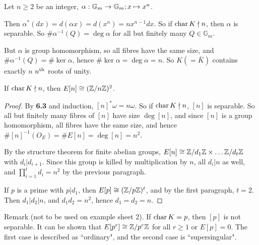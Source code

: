 \documentclass[10pt,a4paper]{article}
\begin{document}
Let $n \geq 2$ be an integer, $\alpha:\mathbb{G}_m \to \mathbb{G}_m; x\mapsto x^n$.

Then $\alpha^{\ast}(dx) = d(\alpha x) =d(x^n) = nx^{n-1}dx$. So if $\operatorname{char} K \nmid n$, then $\alpha$ is separable. So $\# \alpha^{-1}(Q) = \deg \alpha$ for all but finitely many $Q \in \mathbb{G}_m$.

But $\alpha$ is group homomorphism, so all fibres have the same size, and $\#\alpha^{-1}(Q) = \#\ker \alpha$, hence $\# \ker \alpha = \deg \alpha=n$. So $K (=\bar{K})$ contains exactly $n$ $n\textsuperscript{th}$ roots of unity.

\begin{theorem}
  If $\operatorname{char} K \nmid n$, then $E[n] \cong (\mathbb{Z}/n\mathbb{Z})^2$.
\end{theorem}
\begin{proof}
  By \textbf{6.3} and induction, $[n]^\ast \omega = n\omega$. So if $\operatorname{char} K \nmid n$, $[n]$ is separable. So all but finitely many fibres of $[n]$ have size $\deg [n]$, and since $[n]$ is a group homomorphism, all fibres have the same size, and hence $\#[n]^{-1}(O_E) = \#E[n] = \deg [n] = n^2$.

  By the structure theorem for finite abelian groups, $E[n] \cong \mathbb{Z}/d_1\mathbb{Z} \times \ldots \mathbb{Z}/d_t\mathbb{Z}$ with $d_i | d_{i+1}$. Since this group is killed by multiplication by $n$, all $d_i| n$ as well, and $\prod_{i=1}^t d_i = n^2$ by the previous paragraph.

  If $p$ is a prime with $p | d_1$, then $E[p] \cong (\mathbb{Z}/p\mathbb{Z})^t$, and by the first paragraph, $t=2$. Then $d_1|d_2|n$, and $d_1d_2 = n^2$, hence $d_1=d_2 = n$.
\end{proof}
Remark (not to be used on example sheet 2). If $\operatorname{char} K = p$, then $[p]$ is not separable. It can be shown that $E[p^r] \cong \mathbb{Z}/p^r\mathbb{Z}$ for all $r \geq 1$ or $E[p] = 0$. The first case is described as ``ordinary", and the second case is ``supersingular".
\end{document}
